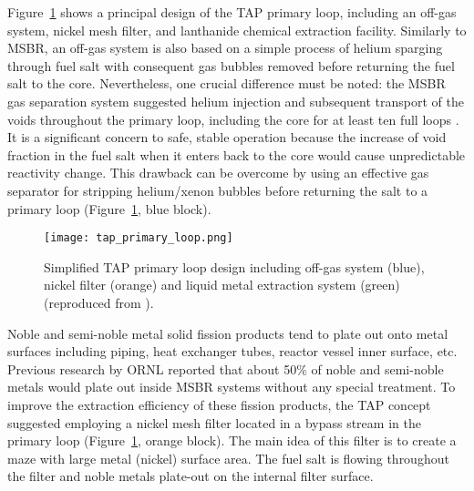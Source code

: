 Figure~\ref{fig:tap-reproc} shows a principal design of the \gls{TAP} primary 
loop, including an off-gas system, nickel mesh filter, and lanthanide chemical 
extraction facility. Similarly to \gls{MSBR}, an off-gas system is also based 
on a simple process of helium sparging through fuel salt with consequent gas 
bubbles removed before returning the fuel salt to the core. Nevertheless, 
one crucial difference must be noted: the \gls{MSBR} gas separation system 
suggested helium injection and subsequent transport of the voids throughout 
the primary loop, including the core for at least ten full loops 
\cite{robertson_conceptual_1971}. It is a significant concern to safe, stable 
operation because the increase of void fraction in the fuel salt when it 
enters back to the core would cause unpredictable reactivity change. This 
drawback can be overcome by using an effective gas separator for stripping 
helium/xenon bubbles before returning the salt to a primary loop 
(Figure~\ref{fig:tap-reproc}, blue block). 
\begin{figure}[htp!] %
	\centering
	\texttt{[image: tap\_primary\_loop.png]}
	\caption{Simplified \gls{TAP} primary loop design including off-gas system 
	(blue), 
		nickel filter (orange) and liquid metal extraction system (green) 
		(reproduced from \cite{transatomic_power_transatomic_2019}).}
	\label{fig:tap-reproc}
\end{figure}

Noble and semi-noble metal solid fission products tend to plate out onto metal 
surfaces including piping, heat exchanger tubes, reactor vessel inner surface, 
etc. Previous research by \gls{ORNL} \cite{robertson_conceptual_1971} reported 
that about 50\% of noble and semi-noble metals would plate out inside 
\gls{MSBR} systems without any special treatment. To improve the extraction 
efficiency of these fission products, the \gls{TAP} concept suggested 
employing a nickel mesh filter located in a bypass stream in the primary loop 
(Figure~\ref{fig:tap-reproc}, orange block). The main idea of this filter is 
to create a maze with large metal (nickel) surface area. The fuel salt is  
flowing throughout the filter and noble metals plate-out on the internal  
filter surface. 

